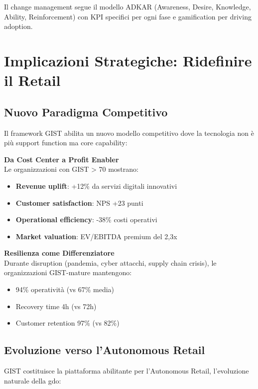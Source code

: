 Il change management segue il modello ADKAR (Awareness, Desire, Knowledge, Ability, Reinforcement) con KPI specifici per ogni fase e gamification per driving adoption.

\section{\texorpdfstring{Implicazioni Strategiche: Ridefinire il Retail}{5.5 - Implicazioni Strategiche}}
\label{sec:5.5}

\subsection{\texorpdfstring{Nuovo Paradigma Competitivo}{5.5.1 - Nuovo Paradigma}}
\label{subsec:5.5.1}

Il framework GIST abilita un nuovo modello competitivo dove la tecnologia non è più support function ma core capability:

\textbf{Da Cost Center a Profit Enabler}\\
Le organizzazioni con GIST > 70 mostrano:
\begin{itemize}
\item \textbf{Revenue uplift}: +12\% da servizi digitali innovativi
\item \textbf{Customer satisfaction}: NPS +23 punti
\item \textbf{Operational efficiency}: -38\% costi operativi
\item \textbf{Market valuation}: EV/EBITDA premium del 2,3x
\end{itemize}

\textbf{Resilienza come Differenziatore}\\
Durante disruption (pandemia, cyber attacchi, supply chain crisis), le organizzazioni GIST-mature mantengono:
\begin{itemize}
\item 94\% operatività (vs 67\% media)
\item Recovery time 4h (vs 72h)
\item Customer retention 97\% (vs 82\%)
\end{itemize}

\subsection{\texorpdfstring{Evoluzione verso l'Autonomous Retail}{5.5.2 - Autonomous Retail}}
\label{subsec:5.5.2}

GIST costituisce la piattaforma abilitante per l'Autonomous Retail, l'evoluzione naturale della \gls{gdo}:

